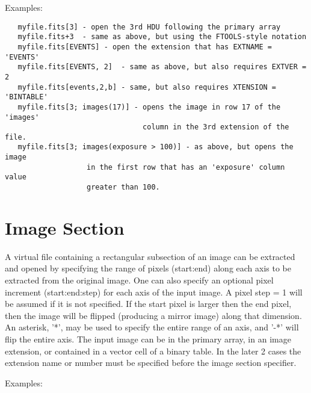 \documentclass[11pt]{book}
\begin{document}
 Examples:

\begin{verbatim}
   myfile.fits[3] - open the 3rd HDU following the primary array
   myfile.fits+3  - same as above, but using the FTOOLS-style notation
   myfile.fits[EVENTS] - open the extension that has EXTNAME = 'EVENTS'
   myfile.fits[EVENTS, 2]  - same as above, but also requires EXTVER = 2
   myfile.fits[events,2,b] - same, but also requires XTENSION = 'BINTABLE'
   myfile.fits[3; images(17)] - opens the image in row 17 of the 'images'
                                column in the 3rd extension of the file.
   myfile.fits[3; images(exposure > 100)] - as above, but opens the image
                   in the first row that has an 'exposure' column value
                   greater than 100.
\end{verbatim}


\section{Image Section}

A virtual file containing a rectangular subsection of an image can be
extracted and opened by specifying the range of pixels (start:end)
along each axis to be extracted from the original image.  One can also
specify an optional pixel increment (start:end:step) for each axis of
the input image.  A pixel step = 1 will be assumed if it is not
specified.  If the start pixel is larger then the end pixel, then the
image will be flipped (producing a mirror image) along that dimension.
An asterisk, '*', may be used to specify the entire range of an axis,
and '-*' will flip the entire axis. The input image can be in the
primary array, in an image extension, or contained in a vector cell of
a binary table. In the later 2 cases the extension name or number must
be specified before the image section specifier.

 Examples:
\end{document}
